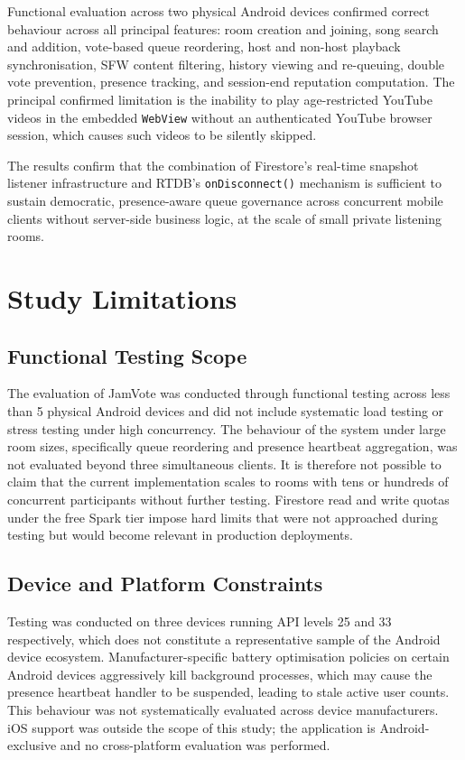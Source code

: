 \documentclass[pdflatex,sn-mathphys-num,iicol]{sn-jnl}
\theoremstyle{thmstyleone}%
\theoremstyle{thmstyletwo}%
\theoremstyle{thmstylethree}%
\begin{document}
Functional evaluation across two physical Android devices confirmed correct behaviour
across all principal features: room creation and joining, song search and addition,
vote-based queue reordering, host and non-host playback synchronisation, SFW content
filtering, history viewing and re-queuing, double vote prevention, presence tracking,
and session-end reputation computation. The principal confirmed limitation is the
inability to play age-restricted YouTube videos in the embedded \texttt{WebView}
without an authenticated YouTube browser session, which causes such videos to be
silently skipped.

The results confirm that the combination of Firestore's real-time snapshot listener
infrastructure and RTDB's \texttt{onDisconnect()} mechanism is sufficient to sustain
democratic, presence-aware queue governance across concurrent mobile clients without
server-side business logic, at the scale of small private listening rooms.

\section{Study Limitations}\label{sec:limitations}

\subsection{Functional Testing Scope}

The evaluation of JamVote was conducted through functional testing across less than 5 physical Android devices and did not include systematic load testing or stress
testing under high concurrency. The behaviour of the system under large room sizes, specifically queue reordering and presence heartbeat
aggregation, was not evaluated beyond three simultaneous clients. It is therefore not possible to claim that the current implementation scales to rooms with tens or
hundreds of concurrent participants without further testing. Firestore read and write
quotas under the free Spark tier impose hard limits that were not approached during
testing but would become relevant in production deployments.

\subsection{Device and Platform Constraints}

Testing was conducted on three devices running API levels 25 and 33 respectively,
which does not constitute a representative sample of the Android device ecosystem.
Manufacturer-specific battery optimisation policies on certain Android devices
aggressively kill background processes, which may cause the presence heartbeat
handler to be suspended, leading to stale active user counts. This behaviour was not systematically evaluated across device
manufacturers. iOS support was outside the scope of this study; the application is Android-exclusive and no cross-platform evaluation was performed.
\end{document}
